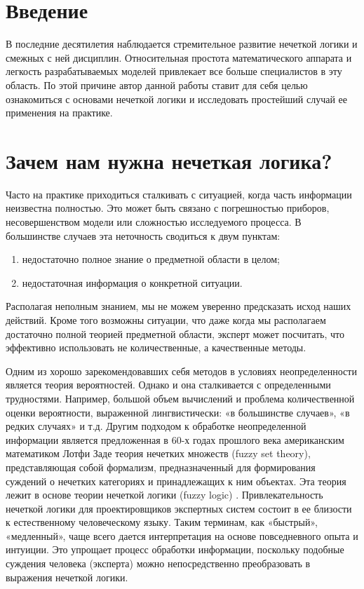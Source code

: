 \documentclass[a4paper,12pt]{article}
\begin{document}
	\section*{Введение}
	В последние десятилетия наблюдается стремительное развитие нечеткой логики и смежных с ней дисциплин. Относительная простота математического аппарата и легкость разрабатываемых моделей привлекает все больше специалистов в эту область. По этой причине автор данной работы ставит для себя целью ознакомиться с основами нечеткой логики и исследовать простейший случай ее применения на практике.
	

	\section{Зачем нам нужна нечеткая логика?} 

	Часто на практике приходиться сталкивать с ситуацией, когда часть информации неизвестна полностью. Это может быть связано с погрешностью приборов, несовершенством модели или сложностью исследуемого процесса. В большинстве случаев эта неточность сводиться к двум пунктам:
	\begin{enumerate}
		\item недостаточно полное знание о предметной области в целом;
		\item недостаточная информация о конкретной ситуации.
	\end{enumerate}

	Располагая неполным знанием, мы не можем уверенно предсказать исход наших действий. Кроме того возможны ситуации, что даже когда мы располагаем достаточно полной теорией предметной области, эксперт может посчитать, что эффективно использовать не количественные, а качественные методы.  
	
	Одним из хорошо зарекомендовавших себя методов в условиях неопределенности является теория вероятностей. Однако и она сталкивается с определенными трудностями. Например, большой объем вычислений и проблема количественной оценки вероятности, выраженной лингвистически: «в большинстве случаев», «в редких случаях» и т.д. 
	Другим подходом к обработке неопределенной информации является предложенная в 60-х годах прошлого века американским математиком Лотфи Заде теория нечетких множеств (fuzzy set theory), представляющая собой формализм, предназначенный для формирования суждений о нечетких категориях и принадлежащих к ним объектах. Эта теория лежит в основе теории нечеткой логики (fuzzy logic) \cite{Zade}. Привлекательность нечеткой логики для проектировщиков экспертных систем состоит в ее близости к естественному человеческому языку. Таким терминам, как «быстрый», «медленный», чаще всего дается интерпретация на основе повседневного опыта и интуиции. Это упрощает процесс обработки информации, поскольку подобные суждения человека (эксперта) можно непосредственно преобразовать в выражения нечеткой логики.
	
\end{document}
